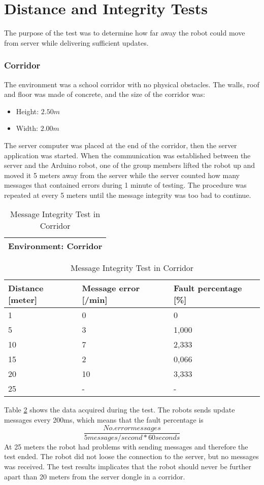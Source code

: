 \newpage
\section{Distance and Integrity Tests}
\label{sec:testcom}
The purpose of the test was to determine how far away the robot could move from server while delivering sufficient updates.
\subsubsection{Corridor}
The environment was a school corridor with no physical obstacles. The walls, roof and floor was made of concrete, and the size of the corridor was:
\begin{itemize}
    \item Height: $2.50 m$
    \item Width: $2.00 m$
\end{itemize}
The server computer was placed at the end of the corridor, then the server application was started. When the communication was established between the server and the Arduino robot, one of the group members lifted the robot up and moved it 5 meters away from the server while the server counted how many messages that contained errors during 1 minute of testing. The procedure was repeated at every 5 meters until the message integrity was too bad to continue.
\newpage
{}

\begin{table}[ht]
\begin{center}
 \begin{tabular}{|p{100pt}|} 
 \hline
 Environment: \textbf{Corridor}\\
 \hline
 \end{tabular}
 \begin{tabular}{|p{90pt}|p{100pt}|p{90pt}|}
 \hline
 Distance [meter] & Message error [/min] &  Fault percentage [\%]\\
 \hline
 1		        &   0 		&	0    \\
 5              &   3  		&	1,000\\
 10             &   7  		&	2,333\\
 15				&	2 		&	0,066\\
 20				&	10 		&	3,333\\
 25				&	-		&	-    \\
 \hline
\end{tabular}
\end{center}
\caption{Message Integrity Test in Corridor}
\label{tab:messintegritycorr}
\end{table}
Table \ref{tab:messintegritycorr} shows the data acquired during the test. The robots sends update messages every 200ms, which means that the fault percentage is $$\frac{No. error messages}{5 messages/second * 60 seconds}$$
At 25 meters the robot had problems with sending messages and therefore the test ended. The robot did not loose the connection to the server, but no messages was received. The test results implicates that the robot should never be further apart than 20 meters from the server dongle in a corridor.

